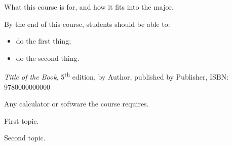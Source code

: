 \documentclass{osucourse}
\begin{document}
\CatalogDescription
\PrerequisitesAndExclusions


\begin{Purpose}
What this course is for, and how it fits into the major.
\end{Purpose}

\begin{LearningOutcomes}
By the end of this course, students should be able to:
\begin{itemize}
\item do the first thing;
\item do the second thing.
\end{itemize}
\end{LearningOutcomes}


\begin{Text}
\emph{Title of the Book}, 5\textsuperscript{th} edition, by Author,
published by Publisher, ISBN: 9780000000000
\end{Text}

\begin{Technology}
Any calculator or software the course requires.
\end{Technology}

\begin{TopicsList}
\item First topic.
\item Second topic.
\end{TopicsList}


\begin{SuggestedSchedule}
\end{SuggestedSchedule}
\end{document}
